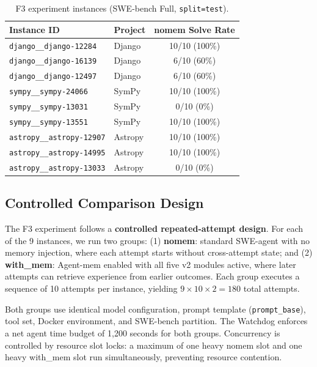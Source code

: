 \documentclass[runningheads]{llncs}
\begin{document}
\begin{table}[h]
\centering
\caption{F3 experiment instances (SWE-bench Full, \texttt{split=test}).}
\label{tab:instances}
\begin{tabular}{llc}
\toprule
\textbf{Instance ID} & \textbf{Project} & \textbf{nomem Solve Rate} \\
\midrule
\texttt{django\_\_django-12284} & Django & 10/10 (100\%) \\
\texttt{django\_\_django-16139} & Django & 6/10 (60\%) \\
\texttt{django\_\_django-12497} & Django & 6/10 (60\%) \\
\texttt{sympy\_\_sympy-24066} & SymPy & 10/10 (100\%) \\
\texttt{sympy\_\_sympy-13031} & SymPy & 0/10 (0\%) \\
\texttt{sympy\_\_sympy-13551} & SymPy & 10/10 (100\%) \\
\texttt{astropy\_\_astropy-12907} & Astropy & 10/10 (100\%) \\
\texttt{astropy\_\_astropy-14995} & Astropy & 10/10 (100\%) \\
\texttt{astropy\_\_astropy-13033} & Astropy & 0/10 (0\%) \\
\bottomrule
\end{tabular}
\end{table}

\subsection{Controlled Comparison Design}

The F3 experiment follows a \textbf{controlled repeated-attempt design}. For each of the 9 instances, we run two groups: (1) \textbf{nomem}: standard SWE-agent with no memory injection, where each attempt starts without cross-attempt state; and (2) \textbf{with\_mem}: Agent-mem enabled with all five v2 modules active, where later attempts can retrieve experience from earlier outcomes. Each group executes a sequence of 10 attempts per instance, yielding $9 \times 10 \times 2 = 180$ total attempts.

Both groups use identical model configuration, prompt template (\texttt{prompt\_base}), tool set, Docker environment, and SWE-bench partition. The Watchdog enforces a net agent time budget of 1,200 seconds for both groups. Concurrency is controlled by resource slot locks: a maximum of one heavy nomem slot and one heavy with\_mem slot run simultaneously, preventing resource contention.
\end{document}

